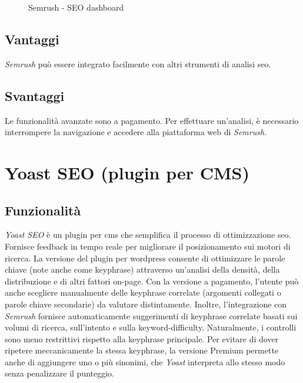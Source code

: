 \begin{figure}[H] 
    \centering 
    \caption{Semrush - SEO dashboard}
\end{figure}

\subsection{Vantaggi}
\par \textit{Semrush} può essere integrato facilmente con altri strumenti di analisi \gls{seo}.

\subsection{Svantaggi}
\par Le funzionalità avanzate sono a pagamento. Per effettuare un'analisi, è necessario interrompere la navigazione e accedere alla piattaforma web di \textit{Semrush}.

\section{Yoast SEO (plugin per CMS)}

\subsection{Funzionalità}
\par \textit{Yoast SEO} è un plugin per \gls{cms} che semplifica il processo di ottimizzazione \gls{seo}. Fornisce feedback in tempo reale per migliorare il posizionamento sui motori di ricerca. La versione del plugin per \gls{wordpress} consente di ottimizzare le parole chiave (note anche come keyphrase) attraverso un'analisi della densità, della distribuzione e di altri fattori \gls{on-page}. Con la versione a pagamento, l'utente può anche scegliere manualmente delle keyphrase correlate (argomenti collegati o parole chiave secondarie) da valutare distintamente. Inoltre, l'integrazione con \textit{Semrush} fornisce automaticamente suggerimenti di keyphrase correlate basati sui volumi di ricerca, sull'intento e sulla \gls{keyword-difficulty}. Naturalmente, i controlli sono meno restrittivi rispetto alla keyphrase principale. Per evitare di dover ripetere meccanicamente la stessa keyphrase, la versione Premium permette anche di aggiungere uno o più sinonimi, che \textit{Yoast} interpreta allo stesso modo senza penalizzare il punteggio.

